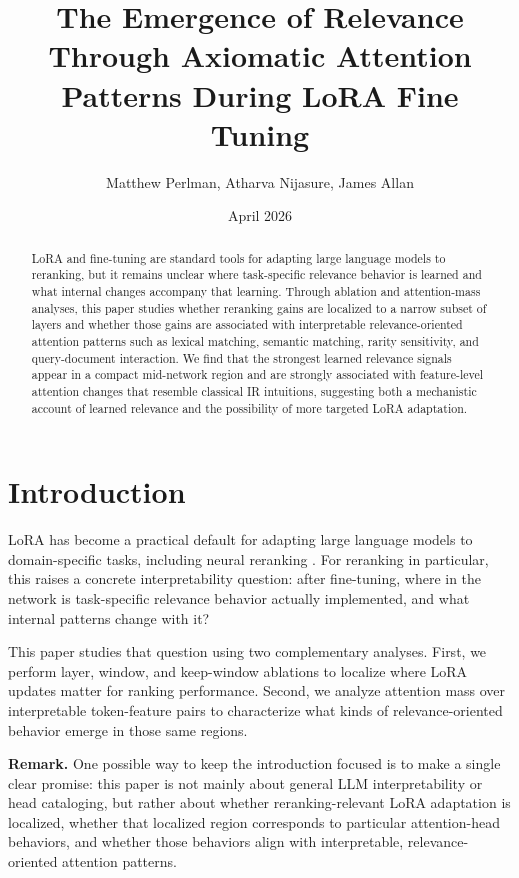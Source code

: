 \documentclass[10pt]{article}
\title{The Emergence of Relevance Through Axiomatic Attention Patterns During LoRA Fine Tuning}
\author{Matthew Perlman, Atharva Nijasure, James Allan}
\date{April 2026}
\newcommand{\remark}[1]{{\color{blue}\textbf{Remark.} #1}}
\begin{document}
\maketitle

\begin{abstract}
LoRA and fine-tuning are standard tools for adapting large language models to reranking, but it remains unclear where task-specific relevance behavior is learned and what internal changes accompany that learning.
Through ablation and attention-mass analyses, this paper studies whether reranking gains are localized to a narrow subset of layers and whether those gains are associated with interpretable relevance-oriented attention patterns such as lexical matching, semantic matching, rarity sensitivity, and query-document interaction.
We find that the strongest learned relevance signals appear in a compact mid-network region and are strongly associated with feature-level attention changes that resemble classical IR intuitions, suggesting both a mechanistic account of learned relevance and the possibility of more targeted LoRA adaptation.
\end{abstract}

\section{Introduction}

LoRA has become a practical default for adapting large language models to domain-specific tasks, including neural reranking \citep{hu2022lora}.
For reranking in particular, this raises a concrete interpretability question: after fine-tuning, where in the network is task-specific relevance behavior actually implemented, and what internal patterns change with it?

This paper studies that question using two complementary analyses.
First, we perform layer, window, and keep-window ablations to localize where LoRA updates matter for ranking performance.
Second, we analyze attention mass over interpretable token-feature pairs to characterize what kinds of relevance-oriented behavior emerge in those same regions.

\remark{One possible way to keep the introduction focused is to make a single clear promise: this paper is not mainly about general LLM interpretability or head cataloging, but rather about whether reranking-relevant LoRA adaptation is localized, whether that localized region corresponds to particular attention-head behaviors, and whether those behaviors align with interpretable, relevance-oriented attention patterns.}
\end{document}
